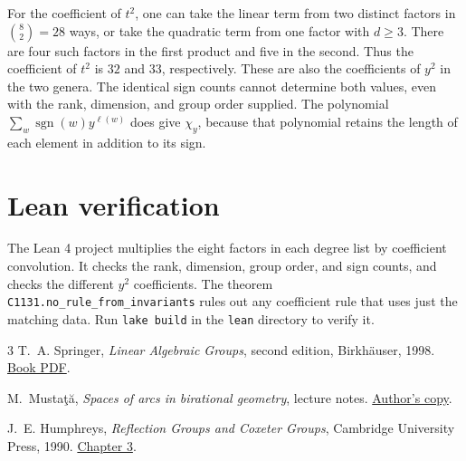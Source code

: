 \documentclass[11pt]{article}
\begin{document}
For the coefficient of $t^2$, one can take the linear term from two
distinct factors in $\binom{8}{2}=28$ ways, or take the quadratic term
from one factor with $d\ge3$. There are four such factors in the first
product and five in the second. Thus the coefficient of $t^2$ is $32$
and $33$, respectively. These are also the coefficients of $y^2$ in
the two genera. The identical sign counts cannot determine both values,
even with the rank, dimension, and group order supplied. The polynomial
$\sum_w\operatorname{sgn}(w)y^{\ell(w)}$ does give $\chi_y$, because that
polynomial retains the length of each element in addition to its sign.

\section*{Lean verification}

The Lean 4 project multiplies the eight factors in each degree list by
coefficient convolution. It checks the rank, dimension, group order,
and sign counts, and checks the different $y^2$ coefficients. The
theorem \texttt{C1131.no\_rule\_from\_invariants} rules out any coefficient
rule that uses just the matching data. Run \texttt{lake build} in the
\texttt{lean} directory to verify it.

\begin{thebibliography}{3}
T.~A. Springer, \emph{Linear Algebraic Groups}, second edition, Birkh\"auser,
1998. \href{https://www.math.utah.edu/~ptrapa/math-library/springer/Springer-Linear-Algebraic%20Groups-1998.pdf}{Book PDF}.

M.~Musta\c{t}\u{a}, \emph{Spaces of arcs in birational geometry},
lecture notes. \href{https://websites.umich.edu/mmustata/lectures_arcs.pdf}{Author's copy}.

J.~E. Humphreys, \emph{Reflection Groups and Coxeter Groups}, Cambridge
University Press, 1990.
\href{https://doi.org/10.1017/CBO9780511623646.004}{Chapter 3}.
\end{thebibliography}
\end{document}
